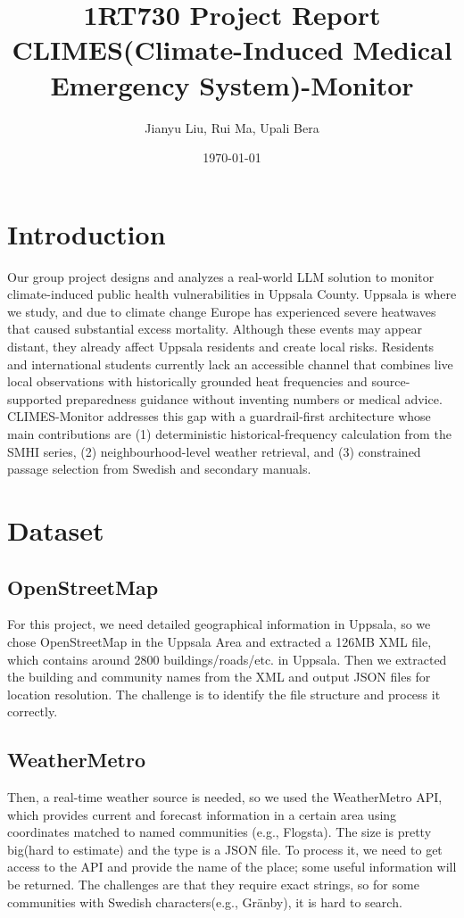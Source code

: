 \documentclass[a4paper,10pt]{article}
\title{\textbf{1RT730 Project Report} 
	\\ CLIMES(Climate-Induced Medical Emergency System)-Monitor}
\author{Jianyu Liu, Rui Ma, Upali Bera}
\date{\today}
\begin{document}
	
\maketitle
    
 \section{Introduction}
Our group project designs and analyzes a real-world LLM solution to monitor climate-induced public health vulnerabilities in Uppsala County. Uppsala is where we study, and due to climate change Europe has experienced severe heatwaves that caused substantial excess mortality\cite{henley2026excess}. Although these events may appear distant, they already affect Uppsala residents and create local risks\cite{uppsala_klimatanpassning}. Residents and international students currently lack an accessible channel that combines live local observations with historically grounded heat frequencies and source-supported preparedness guidance without inventing numbers or medical advice. CLIMES-Monitor addresses this gap with a guardrail-first architecture whose main contributions are (1) deterministic historical-frequency calculation from the SMHI series, (2) neighbourhood-level weather retrieval, and (3) constrained passage selection from Swedish and secondary manuals.

\section{Dataset}
\subsection{OpenStreetMap}
For this project, we need detailed geographical information in Uppsala\cite{openstreetmap_uppsala}, so we chose OpenStreetMap in the Uppsala Area and extracted a 126MB XML file, which contains around 2800 buildings/roads/etc. in Uppsala. Then we extracted the building and community names from the XML and output JSON files for location resolution. The challenge is to identify the file structure and process it correctly.
\subsection{WeatherMetro}
Then, a real-time weather source is needed, so we used the WeatherMetro API, which provides current and forecast information in a certain area using coordinates matched to named communities (e.g., Flogsta). The size is pretty big(hard to estimate) and the type is a JSON file. To process it, we need to get access to the API and provide the name of the place; some useful information will be returned. The challenges are that they require exact strings, so for some communities with Swedish characters(e.g., Gränby), it is hard to search.
\end{document}
